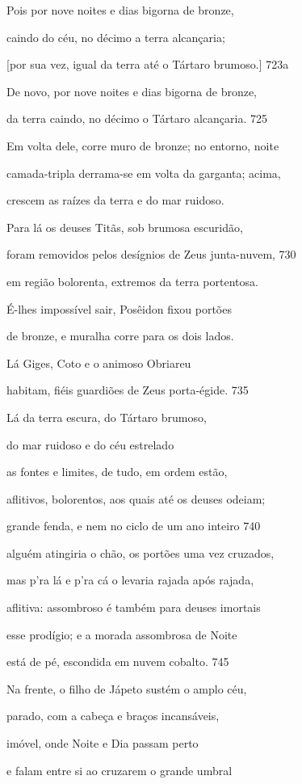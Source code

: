 Pois por nove noites e dias bigorna de bronze,

caindo do céu, no décimo a terra alcançaria;

{[}por sua vez, igual da terra até o Tártaro brumoso.{]} \num{723}a

De novo, por nove noites e dias bigorna de bronze,

da terra caindo, no décimo o Tártaro alcançaria. \num{725}

Em volta dele, corre muro de bronze; no entorno, noite

camada-tripla derrama-se em volta da garganta; acima,

crescem as raízes da terra e do mar ruidoso.

\quad{}Para lá os deuses Titãs, sob brumosa escuridão,

foram removidos pelos desígnios de Zeus junta-nuvem, \num{730}

em região bolorenta, extremos da terra portentosa.

É-lhes impossível sair, Posêidon fixou portões

de bronze, e muralha corre para os dois lados.

\quad{}Lá Giges, Coto e o animoso Obriareu

habitam, fiéis guardiões de Zeus porta-égide. \num{735}

\quad{}Lá da terra escura, do Tártaro brumoso,

do mar ruidoso e do céu estrelado

as fontes e limites, de tudo, em ordem estão,

aflitivos, bolorentos, aos quais até os deuses odeiam;

grande fenda, e nem no ciclo de um ano inteiro \num{740}

alguém atingiria o chão, os portões uma vez cruzados,

mas p'ra lá e p'ra cá o levaria rajada após rajada,

aflitiva: assombroso é também para deuses imortais

esse prodígio; e a morada assombrosa de Noite

está de pé, escondida em nuvem cobalto. \num{745}

\quad{}Na frente, o filho de Jápeto sustém o amplo céu,

parado, com a cabeça e braços incansáveis,

imóvel, onde Noite e Dia passam perto

e falam entre si ao cruzarem o grande umbral

